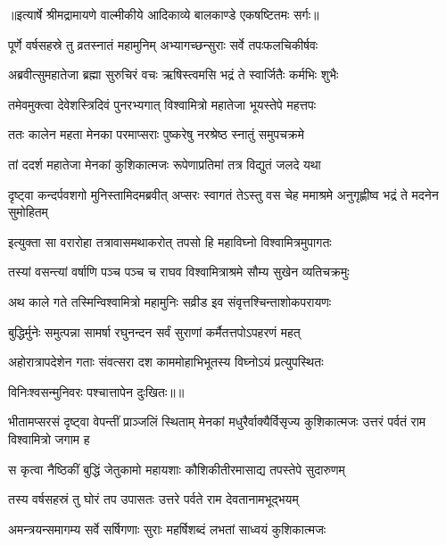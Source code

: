 {॥इत्यार्षे श्रीमद्रामायणे वाल्मीकीये आदिकाव्ये बालकाण्डे एकषष्टितमः सर्गः॥}


\twolineshloka
{पूर्णे वर्षसहस्रे तु व्रतस्नातं महामुनिम्}
{अभ्यागच्छन्सुराः सर्वे तपःफलचिकीर्षवः} %

\twolineshloka
{अब्रवीत्सुमहातेजा ब्रह्मा सुरुचिरं वचः}
{ऋषिस्त्वमसि भद्रं ते स्वार्जितैः कर्मभिः शुभैः} %

\twolineshloka
{तमेवमुक्त्वा देवेशस्त्रिदिवं पुनरभ्यगात्}
{विश्वामित्रो महातेजा भूयस्तेपे महत्तपः} %

\twolineshloka
{ततः कालेन महता मेनका परमाप्सराः}
{पुष्करेषु नरश्रेष्ठ स्नातुं समुपचक्रमे} %

\twolineshloka
{तां ददर्श महातेजा मेनकां कुशिकात्मजः}
{रूपेणाप्रतिमां तत्र विद्युतं जलदे यथा} %

\threelineshloka
{दृष्ट्वा कन्दर्पवशगो मुनिस्तामिदमब्रवीत्}
{अप्सरः स्वागतं तेऽस्तु वस चेह ममाश्रमे}
{अनुगृह्णीष्व भद्रं ते मदनेन सुमोहितम्} %

\twolineshloka
{इत्युक्ता सा वरारोहा तत्रावासमथाकरोत्}
{तपसो हि महाविघ्नो विश्वामित्रमुपागतः} %

\twolineshloka
{तस्यां वसन्त्यां वर्षाणि पञ्च पञ्च च राघव}
{विश्वामित्राश्रमे सौम्य सुखेन व्यतिचक्रमुः} %

\twolineshloka
{अथ काले गते तस्मिन्विश्वामित्रो महामुनिः}
{सव्रीड इव संवृत्तश्चिन्ताशोकपरायणः} %

\twolineshloka
{बुद्धिर्मुनेः समुत्पन्ना सामर्षा रघुनन्दन}
{सर्वं सुराणां कर्मैतत्तपोऽपहरणं महत्} %

\twolineshloka
{अहोरात्रापदेशेन गताः संवत्सरा दश}
{काममोहाभिभूतस्य विघ्नोऽयं प्रत्युपस्थितः} %

{विनिःश्वसन्मुनिवरः पश्चात्तापेन दुःखितः॥॥} %

\addtocounter{shlokacount}{1}

\threelineshloka
{भीतामप्सरसं दृष्ट्वा वेपन्तीं प्राञ्जलिं स्थिताम्}
{मेनकां मधुरैर्वाक्यैर्विसृज्य कुशिकात्मजः}
{उत्तरं पर्वतं राम विश्वामित्रो जगाम ह} %

\twolineshloka
{स कृत्वा नैष्ठिकीं बुद्धिं जेतुकामो महायशाः}
{कौशिकीतीरमासाद्य तपस्तेपे सुदारुणम्} %

\twolineshloka
{तस्य वर्षसहस्रं तु घोरं तप उपासतः}
{उत्तरे पर्वते राम देवतानामभूद्भयम्} %

\twolineshloka
{अमन्त्रयन्समागम्य सर्वे सर्षिगणाः सुराः}
{महर्षिशब्दं लभतां साध्वयं कुशिकात्मजः} %

